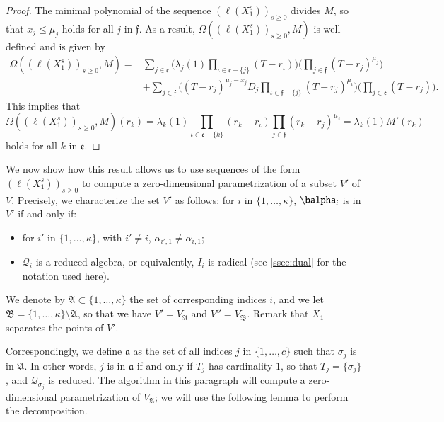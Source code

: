 \documentclass[final,1p,times,authoryear]{elsarticle}
\newcommand{\residueI}{\mathscr{Q}}
\def\dg{\kappa}
\begin{document}
\begin{proof}

  The minimal polynomial of the sequence $(\ell(X_1^s))_{s \ge
  0}$ divides $M$, so that $x_j \le \mu_j$ holds for all $j$
  in $\mathfrak{f}$.  As a result,
  $\Omega((\ell(X_1^s))_{s\ge0},M)$ is well-defined and is given by
  \begin{align*}
    \Omega((\ell(X_1^s))_{s\ge0},M)=&
    \sum_{j \in \mathfrak{e}}
    \Big(
    \lambda_j(1) \prod_{\iota \in \mathfrak{e}-\{j\}}(T-r_\iota)\Big)
    \Big(\prod_{j \in \mathfrak{f}}(T-r_j)^{\mu_j} \Big)\\
                                    &+
                                    \sum_{j\in \mathfrak{f}}
                                    \Big(  (T-r_j)^{\mu_j-x_j} D_j
                                    \prod_{\iota \in \mathfrak{f}-\{j\}}(T-r_j)^{\mu_\iota}\Big)
                                    \Big(\prod_{j\in \mathfrak{e}} (T-r_j) \Big).
  \end{align*}
  This implies that $$\Omega((\ell(X_1^s))_{s\ge0},M)(r_k) =\lambda_k(1) 
  \prod_{\iota \in \mathfrak{e}-\{k\}}(r_k-r_\iota)
  \prod_{j \in \mathfrak{f}}(r_k-r_j)^{\mu_j} = \lambda_k(1) M'(r_k)$$ 
  holds for all $k$ in $\mathfrak{e}$.
\end{proof}

We now show how this result allows us to use sequences of the form
$(\ell(X_1^s))_{s \ge 0}$ to compute a zero-dimensional
parametrization of a subset $V'$ of $V$. Precisely, we characterize
the set $V'$ as follows: for $i$ in $\{1,\dots,\dg\}$, $\balpha_i$ is
in $V'$ if and only if:
\begin{itemize}
  \item for $i'$ in $\{1,\dots,\dg\}$, with $i'\ne i$, $\alpha_{i',1} \ne
    \alpha_{i,1}$;
  \item $\residueI_i$ is a reduced algebra, or equivalently, $I_i$ is radical (see \cref{ssec:dual} 
    for the notation used here).
\end{itemize}
We denote by $\mathfrak{A}\subset \{1,\dots,\dg\}$ the set of
corresponding indices $i$, and we let
$\mathfrak{B}=\{1,\dots,\dg\}\setminus\mathfrak{A}$, so that we have
$V'=V_{\mathfrak{A}}$ and $V''=V_{\mathfrak{B}}$.  Remark that $X_1$
separates the points of $V'$.

Correspondingly, we define $\mathfrak{a}$ as the set of all indices
$j$ in $\{1,\dots,c\}$ such that $\sigma_j$ is in $\mathfrak{A}$. In
other words, $j$ is in $\mathfrak{a}$ if and only if $T_j$ has
cardinality $1$, so that $T_j=\{\sigma_j\}$, and
$\residueI_{\sigma_j}$ is reduced.  The algorithm in this paragraph
will compute a zero-dimensional parametrization of $V_{\mathfrak{A}}$;
we will use the following lemma to perform the decomposition.
\end{document}
